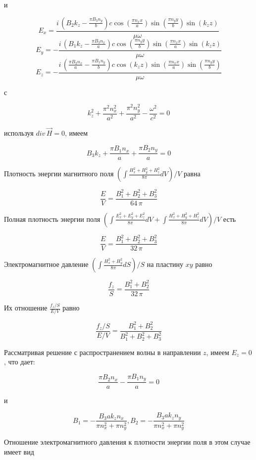 \documentclass[11pt]{article}
\begin{document}
    и

\[E_{x} = \frac{i \, {\left(B_{2} k_{z} - \frac{\pi B_{3} n_{y}}{b}\right)} c \cos\left(\frac{\pi n_{x} x}{a}\right) \sin\left(\frac{\pi n_{y} y}{b}\right) \sin\left(k_{z} z\right)}{\mu \omega}\]
\[E_{y} = -\frac{i \, {\left(B_{1} k_{z} - \frac{\pi B_{3} n_{x}}{a}\right)} c \cos\left(\frac{\pi n_{y} y}{b}\right) \sin\left(\frac{\pi n_{x} x}{a}\right) \sin\left(k_{z} z\right)}{\mu \omega}\]
\[E_{z} = -\frac{i \, {\left(\frac{\pi B_{2} n_{x}}{a} - \frac{\pi B_{1} n_{y}}{b}\right)} c \cos\left(k_{z} z\right) \sin\left(\frac{\pi n_{x} x}{a}\right) \sin\left(\frac{\pi n_{y} y}{b}\right)}{\mu \omega}\]

    с

\[k_{z}^{2} + \frac{\pi^{2} n_{x}^{2}}{a^{2}} + \frac{\pi^{2} n_{y}^{2}}{a^{2}} - \frac{\omega^{2}}{c^{2}} = 0\]

    используя \(div\,\vec{H} = 0\), имеем

\[B_{3} k_{z} + \frac{\pi B_{1} n_{x}}{a} + \frac{\pi B_{2} n_{y}}{a} = 0\]

    Плотность энергии магнитного поля
\(\left(\int \frac{H_x^2+H_y^2+H_z^2}{8 \pi}dV\right)\big/{V}\) равна

\[\frac{E}{V} = \frac{{B_{1}^{2} + B_{2}^{2} + B_{3}^{2}}}{64 \, \pi}\]

    Полная плотность энергии поля
\(\left(\int \frac{E_x^2+E_y^2+E_z^2}{8 \pi}dV + \int \frac{H_x^2+H_y^2+H_z^2}{ 8 \pi}dV\right)\big/{V}\)
есть

    \[\frac{E}{V} = \frac{{B_{1}^{2} + B_{2}^{2} + B_{3}^{2}}}{32 \, \pi}\]

    Электромагнитное давление
\(\left({\int \frac {H_x^2+H_y^2}{8 \pi} dS}\right)\big/{S}\) на
пластину \(xy\) равно

\[\frac{f_z}{S}=\frac{{B_{1}^{2} + B_{2}^{2}}}{32 \, \pi}\]

Их отношение \(\frac{f_z/S}{E/V}\) равно

\[\frac{f_z/S}{E/V} = \frac{{B_{1}^{2} + B_{2}^{2}}}{B_{1}^{2} + B_{2}^{2} + B_{3}^{2}}\]

Рассматривая решение с распространением волны в направлении \(z\), имеем
\(E_z = 0\), что дает:

\[\frac{\pi B_{2} n_{x}}{a} - \frac{\pi B_{1} n_{y}}{a} = 0\]

и

\[B_1 = -\frac{B_{3} a k_{z} n_{x}}{\pi n_{x}^{2} + \pi n_{y}^{2}},
B_2 = -\frac{B_{3} a k_{z} n_{y}}{\pi n_{x}^{2} + \pi n_{y}^{2}}\]

Отношение электромагнитного давления к плотности энергии поля в этом
случае имеет вид
\end{document}

